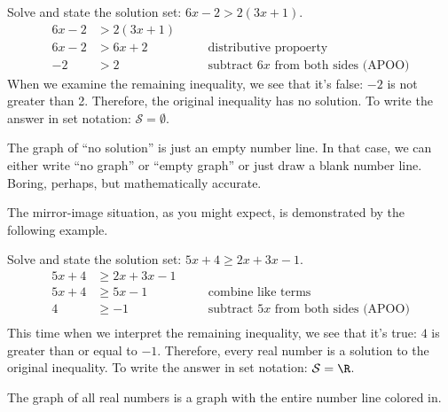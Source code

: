 \begin{boxedex}
Solve and state the solution set: $6x-2>2(3x+1)$.
\[\begin{aligned}
6x-2 &> 2(3x+1)
&& \quad\text{}\\
6x-2 &> 6x+2
&& \quad\text{distributive propoerty}\\
-2 &> 2
&& \quad\text{subtract $6x$ from both sides (APOO)}
\end{aligned}\]
When we examine the remaining inequality, we see that it's false: $-2$ is not greater than 2. Therefore, the original inequality has no solution. To write the answer in set notation: $\mathcal{S}=\emptyset$.

The graph of ``no solution'' is just an empty number line. In that case, we can either write ``no graph'' or ``empty graph'' or just draw a blank number line. Boring, perhaps, but mathematically accurate.
\begin{center}
\end{center}
\end{boxedex}

The mirror-image situation, as you might expect, is demonstrated by the following example.

\begin{boxedex}
Solve and state the solution set: $5x+4 \geq 2x+3x-1$.
\[\begin{aligned}
5x+4 &\geq 2x+3x-1
&& \quad\text{}\\
5x+4 &\geq 5x-1
&& \quad\text{combine like terms}\\
4 &\geq -1
&& \quad\text{subtract $5x$ from both sides (APOO)}\\
\end{aligned}\]
This time when we interpret the remaining inequality, we see that it's true: $4$ is greater than or equal to $-1$. Therefore, every real number is a solution to the original inequality. To write the answer in set notation: $\mathcal{S}=\R$.

The graph of all real numbers is a graph with the entire number line colored in.
\begin{center}
\end{center}
\end{boxedex}

